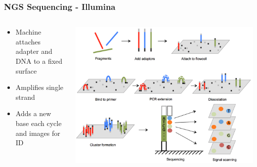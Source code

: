 \documentclass[14pt]{beamer}
\begin{document}
\begin{frame}
\frametitle{NGS Sequencing - Illumina}
\begin{columns}
	\begin{column}{0.5\textwidth}
		\begin{itemize}
			\item Machine attaches adapter and DNA to a fixed surface
			\item Amplifies single strand
			\item Adds a new base each cycle and images for ID
		\end{itemize}
	\end{column}
	\begin{column}{0.5\textwidth}
    	\begin{center}
     		\includegraphics[width=1\textwidth]{images_20170905_illumina.png}
     	\end{center}
		\end{column}
	\end{columns}
\end{frame}
\end{document}
